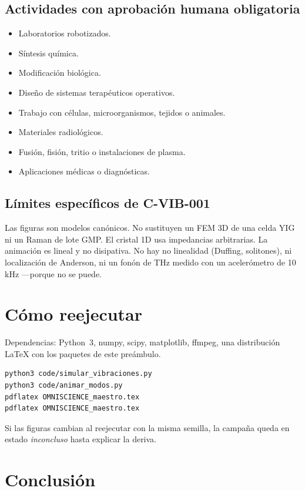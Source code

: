 \documentclass[11pt,a4paper]{article}
\begin{document}
\subsection{Actividades con aprobación humana obligatoria}
\begin{itemize}[itemsep=1pt]
    \item Laboratorios robotizados.
    \item Síntesis química.
    \item Modificación biológica.
    \item Diseño de sistemas terapéuticos operativos.
    \item Trabajo con células, microorganismos, tejidos o animales.
    \item Materiales radiológicos.
    \item Fusión, fisión, tritio o instalaciones de plasma.
    \item Aplicaciones médicas o diagnósticas.
\end{itemize}

\subsection{Límites específicos de C-VIB-001}
\label{sec:limites}

Las figuras son modelos canónicos. No sustituyen un FEM 3D de una celda YIG ni un Raman de lote GMP. El cristal 1D usa impedancias arbitrarias. La animación es lineal y no disipativa. No hay no linealidad (Duffing, solitones), ni localización de Anderson, ni un fonón de THz medido con un acelerómetro de 10\,kHz ---porque no se puede.

\section{Cómo reejecutar}

Dependencias: Python~3, numpy, scipy, matplotlib, ffmpeg, una distribución \LaTeX{} con los paquetes de este preámbulo.

\begin{lstlisting}
python3 code/simular_vibraciones.py
python3 code/animar_modos.py
pdflatex OMNISCIENCE_maestro.tex
pdflatex OMNISCIENCE_maestro.tex
\end{lstlisting}

Si las figuras cambian al reejecutar con la misma semilla, la campaña queda en estado \emph{inconcluso} hasta explicar la deriva.

\section{Conclusión}
\end{document}
